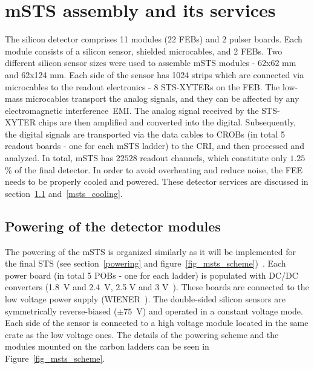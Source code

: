 \section{mSTS assembly and its services}

 The silicon detector comprises 11 modules (22 \glspl{FEB}) and 2 pulser boards. Each module consists of a silicon sensor, shielded microcables, and 2 \glspl{FEB}. Two different silicon sensor sizes were used to assemble \gls{mSTS} modules - 62x62 mm and 62x124 mm. Each side of the sensor has 1024 strips which are connected via microcables to the readout electronics - 8 STS-XYTERs on the \gls{FEB}. The low-mass microcables transport the analog signals, and they can be affected by any electromagnetic interference~\gls{EMI}. The analog signal received by the STS-XYTER chips are then amplified and converted into the digital. Subsequently, the digital signals are transported via the data cables to \glspl{CROB} (in total 5 readout boards - one for each \gls{mSTS} ladder) to the \gls{CRI}, and then processed and analyzed. In total, \gls{mSTS} has $22 528$ readout channels, which constitute only $1.25$\% of the final detector. In order to avoid overheating and reduce noise, the \gls{FEE} needs to be properly cooled and powered. These detector services are discussed in section~\ref{msts_powering} and~\ref{msts_cooling}. 
\subsection{Powering of the detector modules}
\label{msts_powering}
The powering of the \gls{mSTS} is organized similarly as it will be implemented for the final \gls{STS} (see section~\ref{powering} and figure~\ref{fig_msts_scheme})~\cite{Koczon:2020Jc}. Each power board (in total 5 \glspl{POB} - one for each ladder) is populated with DC/DC converters (1.8~V and 2.4~V, 2.5 V and 3 V~\cite{DC_DC_converter}). These boards are connected to the low voltage power supply (WIENER~\cite{wiener}). The double-sided silicon sensors are symmetrically reverse-biased ($\pm 75$~V) and operated in a constant voltage mode. Each side of the sensor is connected to a high voltage module located in the same crate as the low voltage ones. The details of the powering scheme and the modules mounted on the carbon ladders can be seen in Figure~\ref{fig_msts_scheme}.

